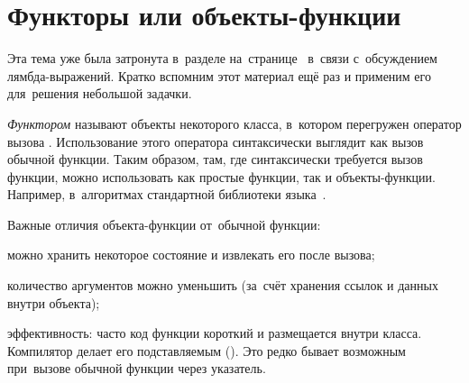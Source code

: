 
\section{Функторы или объекты-функции}
Эта тема уже была затронута в~разделе на~странице~\pageref{sect:lambda} в~связи с~обсуждением лямбда-выражений. Кратко вспомним этот материал ещё раз и применим его для~решения небольшой задачки.

\emph{Функтором} называют объекты некоторого класса, в~котором перегружен оператор вызова . Использование этого оператора синтаксически выглядит как вызов обычной функции. Таким образом, там, где синтаксически требуется вызов функции, можно использовать как простые функции, так и объекты-функции. Например, в~алгоритмах стандартной библиотеки языка~.

Важные отличия объекта-функции от~обычной функции:
\begin{itemfeature}
  \item можно хранить некоторое состояние и извлекать его после вызова;
  \item количество аргументов можно уменьшить (за~счёт хранения ссылок и данных внутри объекта);
  \item эффективность: часто код функции  короткий и размещается внутри класса. Компилятор делает его подставляемым (). Это редко бывает возможным при~вызове обычной функции через указатель.
\end{itemfeature}



